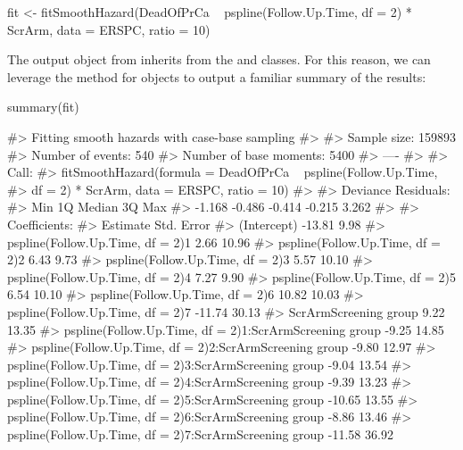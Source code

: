 \begin{Schunk}
\begin{Sinput}
fit <- fitSmoothHazard(DeadOfPrCa ~ pspline(Follow.Up.Time, df = 2) * ScrArm, 
                       data = ERSPC, ratio = 10)
\end{Sinput}
\end{Schunk}

The output object from  inherits from the
 and  classes. For this reason, we can
leverage the  method for  objects to output a
familiar summary of the results:

\begin{Schunk}
\begin{Sinput}
summary(fit) 
\end{Sinput}
\begin{Soutput}
#> Fitting smooth hazards with case-base sampling
#> 
#> Sample size: 159893 
#> Number of events: 540 
#> Number of base moments: 5400 
#> ----
#> 
#> Call:
#> fitSmoothHazard(formula = DeadOfPrCa ~ pspline(Follow.Up.Time, 
#>     df = 2) * ScrArm, data = ERSPC, ratio = 10)
#> 
#> Deviance Residuals: 
#>    Min      1Q  Median      3Q     Max  
#> -1.168  -0.486  -0.414  -0.215   3.262  
#> 
#> Coefficients:
#>                                                        Estimate Std. Error
#> (Intercept)                                              -13.81       9.98
#> pspline(Follow.Up.Time, df = 2)1                           2.66      10.96
#> pspline(Follow.Up.Time, df = 2)2                           6.43       9.73
#> pspline(Follow.Up.Time, df = 2)3                           5.57      10.10
#> pspline(Follow.Up.Time, df = 2)4                           7.27       9.90
#> pspline(Follow.Up.Time, df = 2)5                           6.54      10.10
#> pspline(Follow.Up.Time, df = 2)6                          10.82      10.03
#> pspline(Follow.Up.Time, df = 2)7                         -11.74      30.13
#> ScrArmScreening group                                      9.22      13.35
#> pspline(Follow.Up.Time, df = 2)1:ScrArmScreening group    -9.25      14.85
#> pspline(Follow.Up.Time, df = 2)2:ScrArmScreening group    -9.80      12.97
#> pspline(Follow.Up.Time, df = 2)3:ScrArmScreening group    -9.04      13.54
#> pspline(Follow.Up.Time, df = 2)4:ScrArmScreening group    -9.39      13.23
#> pspline(Follow.Up.Time, df = 2)5:ScrArmScreening group   -10.65      13.55
#> pspline(Follow.Up.Time, df = 2)6:ScrArmScreening group    -8.86      13.46
#> pspline(Follow.Up.Time, df = 2)7:ScrArmScreening group   -11.58      36.92

\end{Soutput}
\end{Schunk}
